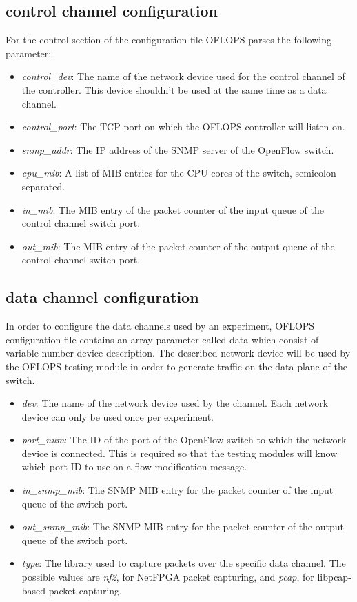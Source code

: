 \documentclass{book}
\begin{document}
\subsection{control channel configuration}
For the control section of the configuration file OFLOPS parses the following parameter:
\begin{itemize}
    \item \emph{control\_dev}: The name of the network device used for the control channel of 
        the controller. This device shouldn't be used at the same time as a data channel. 
    \item \emph{control\_port}: The TCP port on which the OFLOPS controller will listen on.
    \item \emph{snmp\_addr}: The IP address of the SNMP server of the OpenFlow switch.
    \item \emph{cpu\_mib}: A list of MIB entries for the CPU cores of the switch, semicolon 
        separated.
    \item \emph{in\_mib}: The MIB entry of the packet counter of the input queue of the control 
        channel switch port. 
    \item \emph{out\_mib}: The MIB entry of the packet counter of the output queue of the control 
        channel switch port.
\end{itemize} 

\subsection{data channel configuration}

In order to configure the data channels used by an experiment, OFLOPS 
configuration file contains an array parameter called data which consist 
of variable number device description. The described network device will
be used by the OFLOPS testing module in order to generate traffic on the data
plane of the switch. 

\begin{itemize}
    \item \emph{dev}: The name of the network device used by the channel. Each 
        network device can only be used once per experiment. 
    \item \emph{port\_num}: The ID of the port of the OpenFlow switch to which 
        the network device is connected. This is required so that the testing modules
        will know which port ID to use on a flow modification message. 
    \item \emph{in\_snmp\_mib}: The SNMP MIB entry for the packet counter of the 
        input queue of the switch port. 
    \item \emph{out\_snmp\_mib}: The SNMP MIB entry for the packet counter of the
        output queue of the switch port. 
    \item \emph{type}: The library used to capture packets over the specific data
        channel. The possible values are \emph{nf2}, for NetFPGA packet capturing, and 
        \emph{pcap}, for libpcap-based packet capturing. 
\end{itemize}
\end{document}
